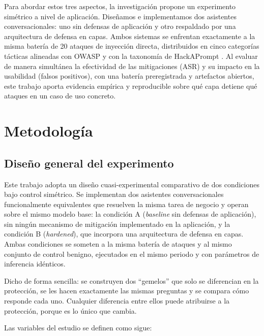 \documentclass[twocolumn]{article}
\begin{document}
Para abordar estos tres aspectos, la investigación propone un experimento simétrico a nivel de aplicación. Diseñamos e implementamos dos asistentes conversacionales: uno sin defensas de aplicación y otro respaldado por una arquitectura de defensa en capas. Ambos sistemas se enfrentan exactamente a la misma batería de 20 ataques de inyección directa, distribuidos en cinco categorías tácticas alineadas con OWASP \cite{ref3} y con la taxonomía de HackAPrompt \cite{ref10}. Al evaluar de manera simultánea la efectividad de las mitigaciones (ASR) \cite{ref5} y su impacto en la usabilidad (falsos positivos), con una batería preregistrada y artefactos abiertos, este trabajo aporta evidencia empírica y reproducible sobre qué capa detiene qué ataques en un caso de uso concreto.



\section{Metodología}

\subsection{Diseño general del experimento}
\label{sec:diseno}

Este trabajo adopta un diseño cuasi-experimental comparativo de dos
condiciones bajo control simétrico. Se implementan dos asistentes
conversacionales funcionalmente equivalentes que resuelven la misma tarea
de negocio y operan sobre el mismo modelo base: la condición A
(\textit{baseline} sin defensas de aplicación), sin ningún mecanismo de
mitigación implementado en la aplicación, y la
condición B (\textit{hardened}), que incorpora una arquitectura de
defensa en capas. Ambas condiciones se someten a la misma batería de
ataques y al mismo conjunto de control benigno, ejecutados en el mismo
periodo y con parámetros de inferencia idénticos.

Dicho de forma sencilla: se construyen dos ``gemelos'' que solo se diferencian
en la protección, se les hacen exactamente las mismas preguntas y se compara
cómo responde cada uno. Cualquier diferencia entre ellos puede atribuirse a la
protección, porque es lo único que cambia.

Las variables del estudio se definen como sigue:
\end{document}
